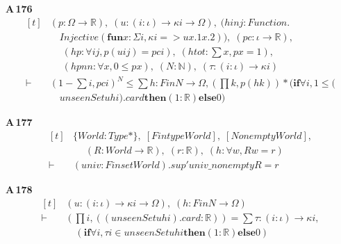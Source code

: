 \noindent\textbf{A\,176}\quad{}
{\footnotesize\[ \begin{aligned}[t]
&(\mathit{p} : \Omega \to \mathbb{R} ),\; (\mathit{u} : (\mathit{i} : \iota ) \to \kappa \mathit{i} \to \Omega ),\; (\mathit{hinj} : \mathit{Function}.\\
&\quad \mathit{Injective} (\mathbf{fun} \mathit{x} : \Sigma \mathit{i}, \kappa \mathit{i} => \mathit{u} \mathit{x}.1 \mathit{x}.2)),\; (\mathit{pc} : \iota \to \mathbb{R} ),\\
&\quad \; (\mathit{hp} : \forall \mathit{i} \mathit{j}, \mathit{p} (\mathit{u} \mathit{i} \mathit{j}) = \mathit{pc} \mathit{i}),\; (\mathit{htot} : \textstyle\sum \mathit{x}, \mathit{p} \mathit{x} = 1),\\
&\quad \; (\mathit{hpnn} : \forall \mathit{x}, 0 \leq \mathit{p} \mathit{x}),\; (\mathit{N} : \mathbb{N} ),\; (\tau : (\mathit{i} : \iota ) \to \kappa \mathit{i})\\
\vdash\;&(1 - \textstyle\sum \mathit{i}, \mathit{pc} \mathit{i}) ^{\mathit{N}} \leq \textstyle\sum \mathit{h} : \mathit{Fin} \mathit{N} \to \Omega , (\textstyle\prod \mathit{k}, \mathit{p} (\mathit{h} \mathit{k})) * (\mathbf{if} \forall \mathit{i}, 1 \leq (\\
&\quad \mathit{unseenSet} \mathit{u} \mathit{h} \mathit{i}).\mathit{card} \mathbf{then} (1:\mathbb{R} ) \mathbf{else} 0)
\end{aligned} \]}

\noindent\textbf{A\,177}\quad{}
{\footnotesize\[ \begin{aligned}[t]
&\{ \mathit{World} : \mathit{Type}*\},\; [\mathit{Fintype} \mathit{World}],\; [\mathit{Nonempty} \mathit{World}],\\
&\quad \; (\mathit{R} : \mathit{World} \to \mathbb{R} ),\; (\mathit{r} : \mathbb{R} ),\; (\mathit{h} : \forall \mathit{w}, \mathit{R} \mathit{w} = \mathit{r})\\
\vdash\;&(\mathit{univ} : \mathit{Finset} \mathit{World}).\mathit{sup'} \mathit{univ\_nonempty} \mathit{R} = \mathit{r}
\end{aligned} \]}

\noindent\textbf{A\,178}\quad{}
{\footnotesize\[ \begin{aligned}[t]
&(\mathit{u} : (\mathit{i} : \iota ) \to \kappa \mathit{i} \to \Omega ),\; (\mathit{h} : \mathit{Fin} \mathit{N} \to \Omega )\\
\vdash\;&(\textstyle\prod \mathit{i}, ((\mathit{unseenSet} \mathit{u} \mathit{h} \mathit{i}).\mathit{card} : \mathbb{R} )) = \textstyle\sum \tau : (\mathit{i} : \iota ) \to \kappa \mathit{i},\\
&\quad (\mathbf{if} \forall \mathit{i}, \tau \mathit{i} \in \mathit{unseenSet} \mathit{u} \mathit{h} \mathit{i} \mathbf{then} (1:\mathbb{R} ) \mathbf{else} 0)
\end{aligned} \]}

